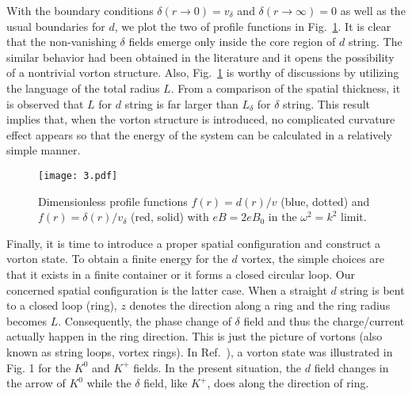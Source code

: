 \documentclass[prd, showpacs,nofootinbib,amsmath,amssymb]{revtex4}
\begin{document}
With the boundary conditions $\delta(r \rightarrow 0) = v_\delta$ and $\delta(r \rightarrow \infty) = 0$
as well as the usual boundaries for $d$, we plot the two of profile functions in Fig.~\ref{fig:3}.
It is clear that the non-vanishing $\delta$ fields emerge only inside the core region of $d$ string.
The similar behavior had been obtained in the literature and it opens the possibility of a nontrivial
vorton structure. Also, Fig.~\ref{fig:3} is worthy of discussions by utilizing the language of the
total radius $L$.
From a comparison of the spatial thickness, it is observed that $L$ for $d$ string is far larger than
$L_\delta$ for $\delta$ string. This result implies that, when the vorton structure is introduced, no
complicated curvature effect appears so that the energy of the system can be calculated in a relatively
simple manner.

\begin{figure}[ht]
\centering
\texttt{[image: 3.pdf]}
	\caption{Dimensionless profile functions $f(r)=d(r)/v$ (blue,
    dotted) and $f(r)=\delta(r)/v_\delta$ (red, solid) with $eB= 2 eB_0$ in the $\omega^2 = k^2$ limit.
     }
	\label{fig:3}
\end{figure}

Finally, it is time to introduce a proper spatial configuration and construct a vorton state.
To obtain a finite energy for the $d$ vortex, the simple choices are that it exists in a finite
container or it forms a closed circular loop.
Our concerned spatial configuration is the latter case. When a straight $d$ string is bent to a
closed loop (ring), $z$ denotes the direction along a ring and the ring radius becomes $L$.
Consequently, the phase change of $\delta$ field and thus the charge/current actually happen in
the ring direction. This is just the picture of vortons (also known as string loops, vortex rings).
In Ref.~\cite{bedaque2011vortons}), a vorton state was illustrated in Fig. 1 for the $K^0$ and
$K^+$ fields. In the present situation, the $d$ field changes in the arrow of $K^0$ while the
$\delta$ field, like $K^+$, does along the direction of ring.
\end{document}

